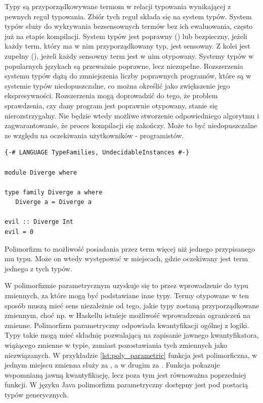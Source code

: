{Typy są przyporządkowywane termom w relacji typowania wynikającej z pewnych
reguł typowania. Zbiór tych reguł składa się na system typów. System typów służy do
wykrywania bezsensownych termów bez ich ewaluowania, często już na etapie kompilacji.
System typów jest poprawny () lub bezpieczny,
jeżeli każdy term, który ma w nim przyporządkowany typ, jest sensowny. Z kolei
jest zupełny (), jeżeli każdy sensowny term jest w nim otypowany.
Systemy typów w
popularnych językach są przeważnie poprawne, lecz niezupełne. Rozszerzenia
systemu typów dążą do zmniejszenia liczby poprawnych programów, które są w
systemie typów niedopuszczalne, co można określić jako zwiększenie jego
ekspresywności. Rozszerzenia mogą doprowadzić do tego, że problem sprawdzenia,
czy dany program jest poprawnie otypowany, stanie się nierozstrzygalny. Nie
będzie wtedy możliwe stworzenie odpowiedniego algorytmu i zagwarantowanie, że
proces kompilacji się zakończy. Może to być niedopuszczalne ze względu na
oczekiwania użytkowników - programistów\cite{TAPL}.

\begin{lstlisting}[float,label={lst:types_diverge},
                   caption={Przykład programu, dla którego statyczne sprawdzanie typów w GHC się nie zakończy.}]
{-# LANGUAGE TypeFamilies, UndecidableInstances #-}

module Diverge where

type family Diverge a where
   Diverge a = Diverge a

evil :: Diverge Int
evil = 0
\end{lstlisting}

Polimorfizm to możliwość posiadania przez term więcej niż jednego przypisanego
mu typu. Może on wtedy występować w miejscach, gdzie oczekiwany jest term jednego
z tych typów.

W polimorfizmie parametrycznym uzyskuje się to przez wprowadzenie
do typu zmiennych, za które mogą być podstawiane inne typy. Termy otypowane w ten
sposób muszą mieć sens niezależnie od tego, jakie typy zostaną przyporządkowane
zmiennym, choć np. w Haskellu istnieje możliwość wprowadzenia ograniczeń na zmienne.
Polimorfizm parametryczny odpowiada kwantyfikacji ogólnej z logiki. Typy takie
mogą mieć składnię pozwalającą na zapisanie jawnego kwantyfikatora, wiążącego
zmienne w typie, zamiast pozostawiania tych zmiennych jako niezwiązanych.
W przykładzie \ref{lst:poly_parametric} funkcja  jest polimorficzna,
w jednym miejscu zmienna  służy za , a w drugim za .
Funkcja  pokazuje wspomnianą jawną kwantyfikację, lecz poza tym jest
równoważna poprzedniej funkcji. W języku Java polimorfizm parametryczny
dostępny jest pod postacią typów generycznych.

}
